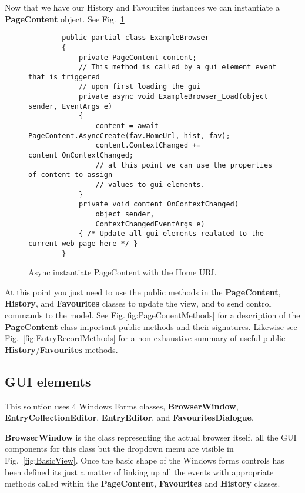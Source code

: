 \documentclass[../Main.tex]{subfiles}
\begin{document}
Now that we have our History and Favourites instances we can instantiate a \textbf{PageContent} object. See Fig.~\ref{fig:asyncCreatePageContent}

\begin{figure}[H]
    \begin{verbatim}
        public partial class ExampleBrowser
        {
            private PageContent content;
            // This method is called by a gui element event that is triggered 
            // upon first loading the gui
            private async void ExampleBrowser_Load(object sender, EventArgs e)
            {
                content = await PageContent.AsyncCreate(fav.HomeUrl, hist, fav);
                content.ContextChanged += content_OnContextChanged;
                // at this point we can use the properties of content to assign 
                // values to gui elements.
            }
            private void content_OnContextChanged(
                object sender,
                ContextChangedEventArgs e)
            { /* Update all gui elements realated to the current web page here */ }
        }
    \end{verbatim}
    \caption{Async instantiate PageContent with the Home URL}
    \label{fig:asyncCreatePageContent}
\end{figure}

At this point you just need to use the public methods in the \textbf{PageContent}, \textbf{History}, and \textbf{Favourites} classes to update the view, and to send control commands to the model. See Fig.\ref{fig:PageConentMethods} for a description of the \textbf{PageContent} class important public methods and their signatures. Likewise see Fig.~\ref{fig:EntryRecordMethods} for a non-exhaustive summary of useful public \textbf{History}/\textbf{Favourites} methods.

\subsection{GUI elements}

This solution uses 4 Windows Forms classes, \textbf{BrowserWindow}, \textbf{EntryCollectionEditor}, \textbf{EntryEditor}, and \textbf{FavouritesDialogue}.

\textbf{BrowserWindow} is the class representing the actual browser itself, all the GUI components for this class but the dropdown menu are visible in Fig.~\ref{fig:BasicView}. Once the basic shape of the Windows forms controls has been defined its just a matter of linking up all the events with appropriate methods called within the \textbf{PageContent}, \textbf{Favourites} and \textbf{History} classes.
\end{document}
